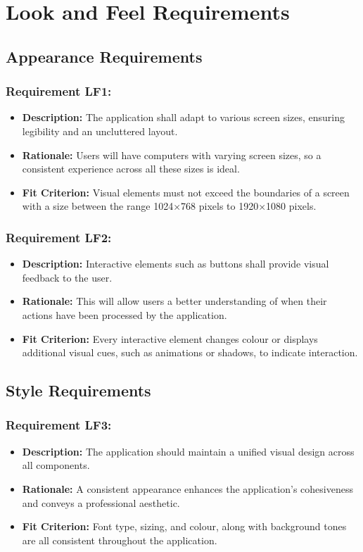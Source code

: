 \documentclass[12pt]{article}
\begin{document}
\section{Look and Feel Requirements}
\subsection{Appearance Requirements}
\subsubsection*{Requirement LF1:}
\begin{itemize}
  \item \textbf{Description:} The application shall adapt to various screen sizes, ensuring legibility and an uncluttered layout.
  \item \textbf{Rationale:} Users will have computers with varying screen sizes, so a consistent experience across all these sizes is ideal.
  \item \textbf{Fit Criterion:} Visual elements must not exceed the boundaries of a screen with a size between the range 1024×768 pixels to 1920×1080 pixels.
\end{itemize}
\subsubsection*{Requirement LF2:}
\begin{itemize}
  \item \textbf{Description:} Interactive elements such as buttons shall provide visual feedback to the user.
  \item \textbf{Rationale:} This will allow users a better understanding of when their actions have been processed by the application.
  \item \textbf{Fit Criterion:} Every interactive element changes colour or displays additional visual cues, such as animations or shadows, to indicate interaction.
\end{itemize}
\subsection{Style Requirements}
\subsubsection*{Requirement LF3:}
\begin{itemize}
  \item \textbf{Description:} The application should maintain a unified visual design across all components.
  \item \textbf{Rationale:} A consistent appearance enhances the application's cohesiveness and conveys a professional aesthetic.
  \item \textbf{Fit Criterion:} Font type, sizing, and colour, along with background tones are all consistent throughout the application.
\end{itemize}
\end{document}
